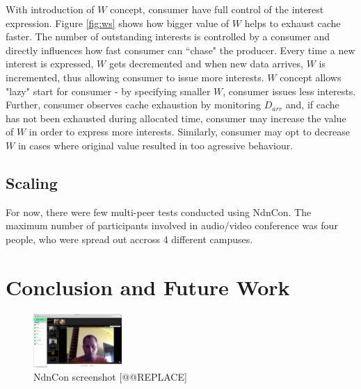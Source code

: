 \documentclass{icn/sig-alternate-2012} %
\newcommand{\ndnconName}{NdnCon}
\begin{document}
With introduction of $W$ concept, consumer have full control of the interest expression. Figure \ref{fig:ws} shows how bigger value of $W$ helps to exhaust cache faster. The number of outstanding interests is controlled by a consumer and directly influences how fast consumer can ``chase" the producer. Every time a new interest is expressed, $W$ gets decremented and when new data arrives, $W$ is incremented, thus allowing consumer to issue more interests. $W$ concept allows "lazy" start for consumer - by specifying smaller $W$, consumer issues less interests. Further, consumer observes cache exhaustion by monitoring $D_{arr}$ and, if cache has not been exhausted during allocated time, consumer may increase the value of $W$ in order to express more interests. Similarly, consumer may opt to decrease $W$ in cases where original value resulted in too agressive behaviour.






\subsection{Scaling}

For now, there were few multi-peer tests conducted using NdnCon. The maximum number of participants involved in audio/video conference was four people, who were spread out accross 4 different campuses.

\section{Conclusion and Future Work}
\label{sec:conclusion}


\begin{figure}[t!]
\centering
\includegraphics[width=0.3\textwidth]{ndncon}
\caption{\ndnconName{} screenshot [@@REPLACE]}
\label{fig:ndncon}
\end{figure}
\end{document}
